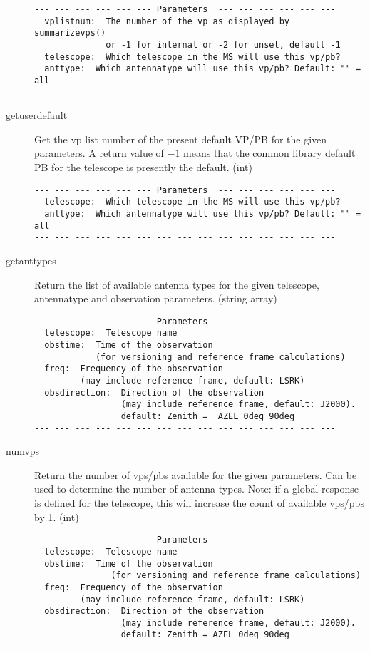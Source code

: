 \documentclass[12pt]{article}
\begin{document}
\begin{description}
{\small
\begin{verbatim}
--- --- --- --- --- --- Parameters  --- --- --- --- --- ---
  vplistnum:  The number of the vp as displayed by summarizevps() 
              or -1 for internal or -2 for unset, default -1 
  telescope:  Which telescope in the MS will use this vp/pb? 
  anttype:  Which antennatype will use this vp/pb? Default: "" = all 
--- --- --- --- --- --- --- --- --- --- --- --- --- --- ---
\end{verbatim} 
} 


  \item[getuserdefault]
   Get the vp list number of the present default VP/PB for the given parameters.
   A return value of $-1$ means that the common library default PB for the telescope 
   is presently the default. (int)  
   
{\small
\begin{verbatim}
--- --- --- --- --- --- Parameters  --- --- --- --- --- ---
  telescope:  Which telescope in the MS will use this vp/pb? 
  anttype:  Which antennatype will use this vp/pb? Default: "" = all 
--- --- --- --- --- --- --- --- --- --- --- --- --- --- ---
\end{verbatim} 
} 

  \item[getanttypes]
   Return the list of available antenna types for the given telescope, antennatype
   and observation parameters. (string array)

{\small
\begin{verbatim}
--- --- --- --- --- --- Parameters  --- --- --- --- --- ---
  telescope:  Telescope name 
  obstime:  Time of the observation 
            (for versioning and reference frame calculations) 
  freq:  Frequency of the observation 
         (may include reference frame, default: LSRK) 
  obsdirection:  Direction of the observation 
                 (may include reference frame, default: J2000). 
                 default: Zenith =  AZEL 0deg 90deg 
--- --- --- --- --- --- --- --- --- --- --- --- --- --- ---
\end{verbatim} 
} 

  \item[numvps]
   Return the number of vps/pbs available for the given parameters.
   Can be used to determine the number of antenna types.
   Note: if a global response is defined for the telescope, this will increase the count of
   available vps/pbs by 1. (int)
{\small
\begin{verbatim}
--- --- --- --- --- --- Parameters  --- --- --- --- --- ---
  telescope:  Telescope name 
  obstime:  Time of the observation 
               (for versioning and reference frame calculations) 
  freq:  Frequency of the observation 
         (may include reference frame, default: LSRK) 
  obsdirection:  Direction of the observation 
                 (may include reference frame, default: J2000). 
                 default: Zenith = AZEL 0deg 90deg 
--- --- --- --- --- --- --- --- --- --- --- --- --- --- ---
\end{verbatim} 
} 



\end{description}
\end{document}
